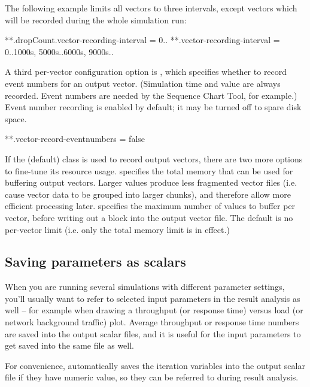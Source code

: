 The following example limits all vectors to three intervals, except
 vectors which will be recorded during the whole
simulation run:

\begin{inifile}
**.dropCount.vector-recording-interval = 0..
**.vector-recording-interval = 0..1000s, 5000s..6000s, 9000s..
\end{inifile}

A third per-vector configuration option is ,
which specifies whether to record event numbers for an output vector.
(Simulation time and value are always recorded. Event numbers are needed
by the Sequence Chart Tool, for example.) Event number recording is enabled
by default; it may be turned off to spare disk space.

\begin{inifile}
**.vector-record-eventnumbers = false
\end{inifile}

If the (default)  class is used to
record output vectors, there are two more options to fine-tune its resource
usage.  specifies the total memory that
can be used for buffering output vectors. Larger values produce less
fragmented vector files (i.e. cause vector data to be grouped into larger
chunks), and therefore allow more efficient processing later.
 specifies the maximum number of values to
buffer per vector, before writing out a block into the output vector file.
The default is no per-vector limit (i.e. only the total memory limit is in
effect.)


\subsection{Saving parameters as scalars}

When you are running several simulations with different parameter
settings, you'll usually want to refer to selected
input parameters in the result analysis as well -- for example when
drawing a throughput (or response time) versus load (or network
background traffic) plot. Average throughput or response time numbers
are saved into the output scalar files, and it is useful for the input
parameters to get saved into the same file as well.

For convenience, {\opp} automatically saves the iteration variables
into the output scalar file if they have numeric value, so they can
be referred to during result analysis.


